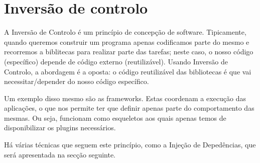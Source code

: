 \section{Inversão de controlo}

A Inversão de Controlo é um princípio de concepção de software. Tipicamente, quando queremos construir um programa apenas codificamos parte do mesmo e recorremos a biblitecas para realizar parte das tarefas; neste caso, o nosso código (específico) depende de código externo (reutilizável). Usando Inversão de Controlo, a abordagem é a oposta: o código reutilizável das bibliotecas é que vai necessitar/depender do nosso código específico.

Um exemplo disso mesmo são as frameworks. Estas coordenam a execução das aplicações, o que nos permite ter que definir apenas parte do comportamento das mesmas. Ou seja, funcionam como esqueletos aos quais apenas temos de disponibilizar os plugins necessários.

Há várias técnicas que seguem este princípio, como a Injeção de Depedências, que será apresentada na secção seguinte.
